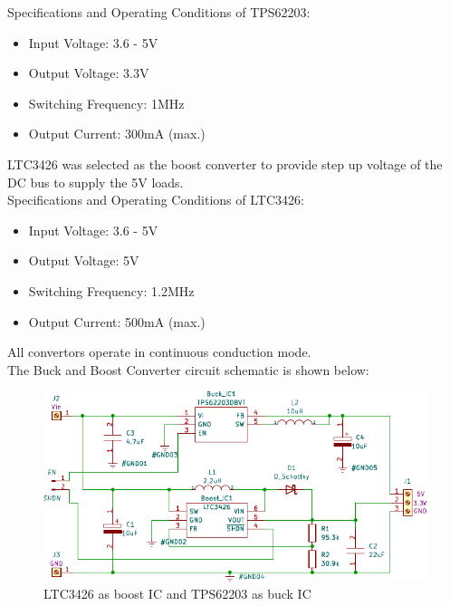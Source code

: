  Specifications and Operating Conditions of TPS62203:
\begin{itemize}
	\item Input Voltage: 3.6 - 5V
	\item Output Voltage:  3.3V
	\item Switching Frequency: 1MHz
	\item Output Current: 300mA (max.)
\end{itemize}


 LTC3426 was selected as the boost converter to provide step up voltage of the DC bus to supply the 5V loads.\\
 
  Specifications and Operating Conditions of LTC3426:
 \begin{itemize}
 	\item Input Voltage: 3.6 - 5V
 	\item Output Voltage: 5V
 	\item Switching Frequency: 1.2MHz
 	\item Output Current: 500mA (max.)
 \end{itemize}
All convertors operate in continuous conduction mode.\\

The Buck and Boost Converter circuit schematic is shown below:
\begin{figure}[ht]
	\centering
	\includegraphics[width=\columnwidth]{1.pdf}
	\caption{LTC3426 as boost IC and TPS62203 as buck IC}
	\label{fig:bubo}
\end{figure}



